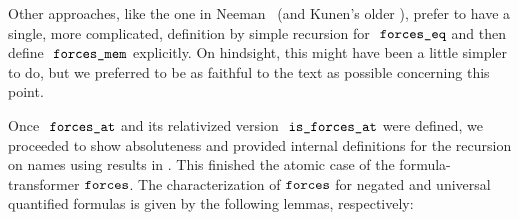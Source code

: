 Other approaches, like the one in Neeman~\cite{neeman-course} (and
Kunen's older \cite{kunen1980}), prefer
to have a single, more complicated, definition by simple recursion for
$\forceseq$ and then define $\forcesmem$ explicitly. On hindsight,
this might have been a little simpler to do, but we preferred to be as
faithful to the text as possible concerning this point.

Once $\forcesat$ and its relativized version
$\isatt{is{\isacharunderscore}forces{\isacharunderscore}at}$ were
defined, we proceeded to show absoluteness and provided internal
definitions for the recursion on names using results in
. This finished the atomic case of the
formula-transformer $\mathop{\mathtt{forces}}$. The characterization of $\mathop{\mathtt{forces}}$
for negated and universal quantified formulas is given by the
following lemmas, respectively:
%
